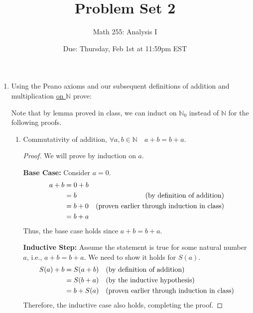 \documentclass[10pt]{article}
\newcommand{\N}{\mathbb{N}}
\newenvironment{problem}[2][Problem]{\begin{trivlist}
\item[\hskip \labelsep {\bfseries #1}\hskip \labelsep {\bfseries #2.}]}{\end{trivlist}}
\begin{document}
\title{\vspace{-2cm} Problem Set 2}
\author{Math 255: Analysis I}
\date{Due: Thursday, Feb 1st at 11:59pm EST}

\maketitle

\begin{problem}{1}\;
	\begin{enumerate}
		\item Using the Peano axioms and our subsequent definitions of addition and multiplication \underline{on $ \N $} prove:

            Note that by lemma proved in class, we can induct on $\N_0$ instead of $\N$ for the following proofs.
			\begin{enumerate}%
				\item Commutativity of addition, $ \forall a,b \in \N \quad a+b=b+a $.

                    \begin{proof}
                        We will prove by induction on \( a \).

                        \textbf{Base Case:} Consider \( a = 0 \).
                        \begin{align*}
                            a + b &= 0 + b \\
                                  &= b & \text{(by definition of addition)} \hfill \\
                                  &= b + 0 & \text{(proven earlier through induction in class)} \hfill \\
                                  &= b + a          
                        \end{align*}
                        Thus, the base case holds since \( a + b = b + a \).

                        \textbf{Inductive Step:} Assume the statement is true for some natural number \( a \), i.e., \( a + b = b + a \). We need to show it holds for \( S(a) \).
                        \begin{align*}
                            S(a) + b &= S(a + b) \quad \text{(by definition of addition)} \hfill \\
                                     &= S(b + a) \quad \text{(by the inductive hypothesis)} \hfill \\
                                     &= b + S(a) \quad \text{(proven earlier through induction in class)} \hfill
                        \end{align*}
                        Therefore, the inductive case also holds, completing the proof.
                    \end{proof}



\end{enumerate}
\end{enumerate}
\end{problem}
\end{document}

